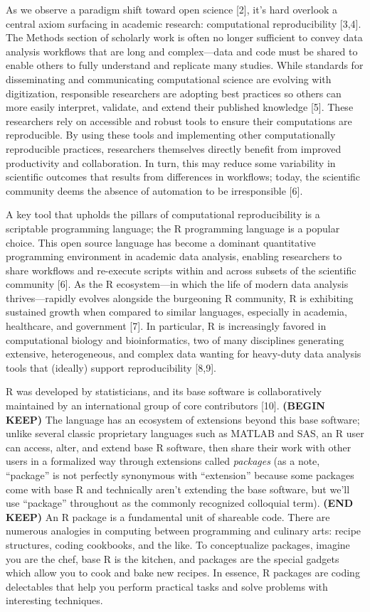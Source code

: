 \documentclass[10pt,letterpaper]{article}
\begin{document}
As we observe a paradigm shift toward open science {[}2{]}, it's hard
overlook a central axiom surfacing in academic research: computational
reproducibility {[}3,4{]}. The Methods section of scholarly work is
often no longer sufficient to convey data analysis workflows that are
long and complex---data and code must be shared to enable others to
fully understand and replicate many studies. While standards for
disseminating and communicating computational science are evolving with
digitization, responsible researchers are adopting best practices so
others can more easily interpret, validate, and extend their published
knowledge {[}5{]}. These researchers rely on accessible and robust tools
to ensure their computations are reproducible. By using these tools and
implementing other computationally reproducible practices, researchers
themselves directly benefit from improved productivity and
collaboration. In turn, this may reduce some variability in scientific
outcomes that results from differences in workflows; today, the
scientific community deems the absence of automation to be irresponsible
{[}6{]}.

A key tool that upholds the pillars of computational reproducibility is
a scriptable programming language; the R programming language is a
popular choice. This open source language has become a dominant
quantitative programming environment in academic data analysis, enabling
researchers to share workflows and re-execute scripts within and across
subsets of the scientific community {[}6{]}. As the R ecosystem---in
which the life of modern data analysis thrives---rapidly evolves
alongside the burgeoning R community, R is exhibiting sustained growth
when compared to similar languages, especially in academia, healthcare,
and government {[}7{]}. In particular, R is increasingly favored in
computational biology and bioinformatics, two of many disciplines
generating extensive, heterogeneous, and complex data wanting for
heavy-duty data analysis tools that (ideally) support reproducibility
{[}8,9{]}.

R was developed by statisticians, and its base software is
collaboratively maintained by an international group of core
contributors {[}10{]}. \textbf{(BEGIN KEEP)} The language has an
ecosystem of extensions beyond this base software; unlike several
classic proprietary languages such as MATLAB and SAS, an R user can
access, alter, and extend base R software, then share their work with
other users in a formalized way through extensions called
\emph{packages} (as a note, ``package'' is not perfectly synonymous with
``extension'' because some packages come with base R and technically
aren't extending the base software, but we'll use ``package'' throughout
as the commonly recognized colloquial term). \textbf{(END KEEP)} An R
package is a fundamental unit of shareable code. There are numerous
analogies in computing between programming and culinary arts: recipe
structures, coding cookbooks, and the like. To conceptualize packages,
imagine you are the chef, base R is the kitchen, and packages are the
special gadgets which allow you to cook and bake new recipes. In
essence, R packages are coding delectables that help you perform
practical tasks and solve problems with interesting techniques.
\end{document}
